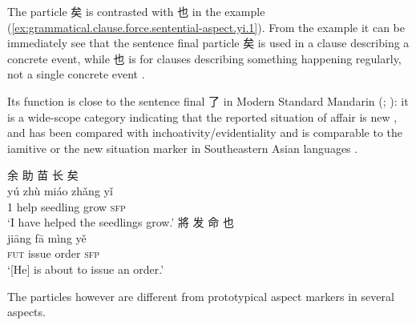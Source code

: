 \documentclass[UTF8, a4paper, oneside, scheme=plain, 12pt]{ctexrep}
\newcommand*{\citepage}[1]{p.~{#1}}
\newcommand*{\citepages}[1]{pp.~{#1}}
\newcommand{\translate}[1]{`#1'}
\newcommand*{\category}[1]{\textsc{#1}}
\begin{document}
The particle 矣 is contrasted with 也 in the example (\ref{ex:grammatical.clause.force.sentential-aspect.yi.1}).
From the example it can be immediately see that the sentence final particle 矣 is used in a clause describing a concrete event, 
while 也 is for clauses describing something happening regularly, not a single concrete event
\citep[\citepages{443-445}]{meiguang2018}.

Its function is close to the sentence final 了 in Modern Standard Mandarin
(\citealt{paul2014particles}; \citealt{pan2021sentence}):
it is a wide-scope category indicating that the reported situation of affair is new
\citep[\citepage{116}]{pulleyblank1995outline},
and has been compared with inchoativity/evidentiality \citep{tsai2008tense}
and is comparable to the iamitive or the new situation marker in Southeastern Asian languages \citep{mazzitelli2025aspect}.



\begin{exe}
    \ex\label{ex:grammatical.clause.force.sentential-aspect.yi.1}
    \glll 余 助 苗 长 矣 \\
    yú zhù miáo zhǎng yǐ \\
    1 help seedling grow \category{sfp} \\
    \glt\translate{I have helped the seedlings grow.}
    \ex\label{ex:grammatical.clause.force.sentential-aspect.ye.1}
    \glll 將 发 命 也 \\
    jiāng fā mìng yě \\
    \category{fut} issue order \category{sfp} \\
    \glt\translate{[He] is about to issue an order.}
\end{exe}

The particles however are different from prototypical aspect markers in several aspects.
\end{document}
